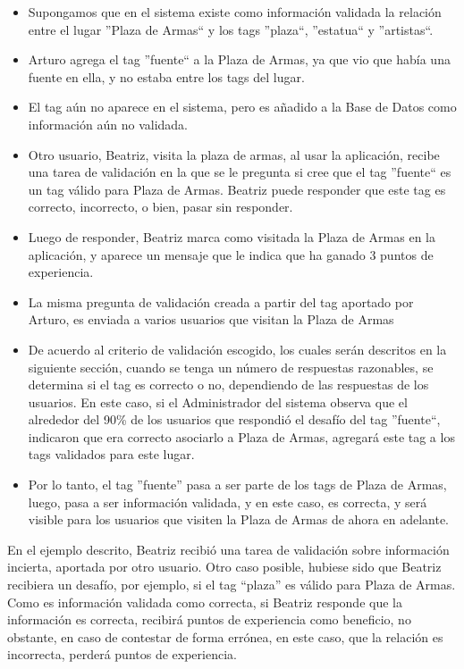 \documentclass[10pt,letterpaper]{article}
\begin{document}
\begin{itemize}
 \item Supongamos que en el sistema existe como información validada la relación entre el lugar ''Plaza de Armas`` y los tags ''plaza``, ''estatua`` y ''artistas``.
 \item Arturo agrega el tag ''fuente`` a la Plaza de Armas, ya que vio que había una fuente en ella, y no estaba entre los tags del lugar.
 \item El tag aún no aparece en el sistema, pero es añadido a la Base de Datos como información aún no validada.
 \item Otro usuario, Beatriz, visita la plaza de armas, al usar la aplicación, recibe una tarea de validación en la que se le pregunta si cree que el tag ''fuente`` es un tag válido para Plaza de Armas. Beatriz puede responder que este tag es correcto, incorrecto, o bien, pasar sin responder.
 \item Luego de responder, Beatriz marca como visitada la Plaza de Armas en la aplicación, y aparece un mensaje que le indica que ha ganado 3 puntos de experiencia.
 \item La misma pregunta de validación creada a partir del tag aportado por Arturo, es enviada a varios usuarios que visitan la Plaza de Armas
 \item De acuerdo al criterio de validación escogido, los cuales serán descritos en la siguiente sección, cuando se tenga un número de respuestas razonables, se determina si el tag es correcto o no, dependiendo de las respuestas de los usuarios. En este caso, si el Administrador del sistema observa que el alrededor del 90\% de los usuarios que respondió el desafío del tag ''fuente``, indicaron que era correcto asociarlo a Plaza de Armas, agregará este tag a los tags validados para este lugar.
 \item Por lo tanto, el tag ''fuente'' pasa a ser parte de los tags de Plaza de Armas, luego, pasa a ser información validada, y en este caso, es correcta, y será visible para los usuarios que visiten la Plaza de Armas de ahora en adelante.

\end{itemize}

En el ejemplo descrito, Beatriz recibió una tarea de validación sobre información incierta, aportada por otro usuario. Otro caso posible, hubiese sido que Beatriz recibiera un desafío, por ejemplo, si el tag ``plaza'' es válido para Plaza de Armas. Como es información validada como correcta, si Beatriz responde que la información es correcta, recibirá puntos de experiencia como beneficio, no obstante, en caso de contestar de forma errónea, en este caso, que la relación es incorrecta, perderá puntos de experiencia.\\
\end{document}
